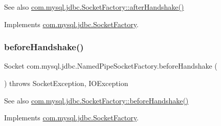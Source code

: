 \begin{DoxySeeAlso}{See also}
\mbox{\hyperlink{interfacecom_1_1mysql_1_1jdbc_1_1_socket_factory_adc5277dd008da61b24261a983202f5bf}{com.\+mysql.\+jdbc.\+Socket\+Factory\+::after\+Handshake()}} 
\end{DoxySeeAlso}


Implements \mbox{\hyperlink{interfacecom_1_1mysql_1_1jdbc_1_1_socket_factory_adc5277dd008da61b24261a983202f5bf}{com.\+mysql.\+jdbc.\+Socket\+Factory}}.

\mbox{\label{classcom_1_1mysql_1_1jdbc_1_1_named_pipe_socket_factory_ad9b744457afb6727e696dc11e69c4b15}} 
\subsubsection{\texorpdfstring{before\+Handshake()}{beforeHandshake()}}
{\footnotesize\ttfamily Socket com.\+mysql.\+jdbc.\+Named\+Pipe\+Socket\+Factory.\+before\+Handshake (\begin{DoxyParamCaption}{ }\end{DoxyParamCaption}) throws Socket\+Exception, I\+O\+Exception}

\begin{DoxySeeAlso}{See also}
\mbox{\hyperlink{interfacecom_1_1mysql_1_1jdbc_1_1_socket_factory_aa9a78553a76681f49c734aaa3f8f126b}{com.\+mysql.\+jdbc.\+Socket\+Factory\+::before\+Handshake()}} 
\end{DoxySeeAlso}


Implements \mbox{\hyperlink{interfacecom_1_1mysql_1_1jdbc_1_1_socket_factory_aa9a78553a76681f49c734aaa3f8f126b}{com.\+mysql.\+jdbc.\+Socket\+Factory}}.

\mbox{\label{classcom_1_1mysql_1_1jdbc_1_1_named_pipe_socket_factory_a11fcef05ddc58b721b102fc810d12d5f}} 
